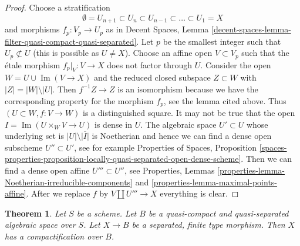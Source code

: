 \documentclass{stacks-project}
\newenvironment{reference}{\comment}{\endcomment}
\theoremstyle{plain}
\newtheorem{theorem}[subsection]{Theorem}
\theoremstyle{definition}
\theoremstyle{remark}
\numberwithin{equation}{subsection}
\def\Im{\mathop{\mathrm{Im}}}
\begin{document}
\begin{proof}
Choose a stratification
$$
\emptyset = U_{n + 1} \subset
U_n \subset U_{n - 1} \subset \ldots \subset U_1 = X
$$
and morphisms $f_p : V_p \to U_p$ as in Decent Spaces, Lemma
\ref{decent-spaces-lemma-filter-quasi-compact-quasi-separated}.
Let $p$ be the smallest integer such that $U_p \not \subset U$
(this is possible as $U \not = X$). Choose an affine open $V \subset V_p$
such that the \'etale morphism $f_p|_V : V \to X$ does not factor through $U$.
Consider the open $W = U \cup \Im(V \to X)$ and the
reduced closed subspace $Z \subset W$ with $|Z| = |W| \setminus |U|$.
Then $f^{-1}Z \to Z$ is an isomorphism because we have the
corresponding property for the morphism $f_p$, see the lemma cited above.
Thus $(U \subset W, f : V \to W)$ is a distinguished square.
It may not be true that the open $I = \Im(U \times_W V \to U)$
is dense in $U$. The algebraic space $U' \subset U$ whose underlying
set is $|U| \setminus \overline{|I|}$ is Noetherian
and hence we can find a dense open subscheme $U'' \subset U'$, see
for example Properties of Spaces, Proposition
\ref{spaces-properties-proposition-locally-quasi-separated-open-dense-scheme}.
Then we can find a dense open affine $U''' \subset U''$, see
Properties, Lemmas \ref{properties-lemma-Noetherian-irreducible-components}
and \ref{properties-lemma-maximal-points-affine}.
After we replace $f$ by $V \amalg U''' \to X$ everything is clear.
\end{proof}

\begin{theorem}
\label{theorem-nagata}
\begin{reference}
\cite{CLO}
\end{reference}
Let $S$ be a scheme. Let $B$ be a quasi-compact and quasi-separated
algebraic space over $S$. Let $X \to B$ be a separated, finite type morphism.
Then $X$ has a compactification over $B$.
\end{theorem}
\end{document}
